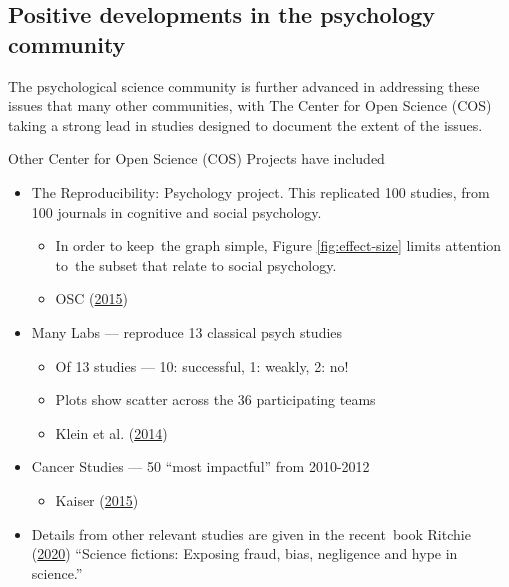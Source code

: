 \documentclass[
  10ptls,
  b5paper]{book}
\providecommand{\tightlist}{%
  \setlength{\itemsep}{0pt}\setlength{\parskip}{0pt}}
\begin{document}
\hypertarget{positive-developments-in-the-psychology-community}{%
\subsection*{Positive developments in the psychology community}\label{positive-developments-in-the-psychology-community}}

The psychological science community is further advanced in
addressing these issues that many other communities, with
The Center for Open Science (COS) taking a strong lead in
studies designed to document the extent of the issues.

Other Center for Open Science (COS) Projects have included

\begin{itemize}
\tightlist
\item
  The Reproducibility: Psychology project. This replicated
  100 studies, from 100 journals in cognitive and social
  psychology.

  \begin{itemize}
  \tightlist
  \item
    In order to keep~the graph simple, Figure
    \ref{fig:effect-size} limits attention to~the
    subset that relate to social psychology.
  \item
    OSC (\protect\hyperlink{ref-osc_EstRep2015}{2015})
  \end{itemize}
\item
  Many Labs --- reproduce 13 classical psych studies

  \begin{itemize}
  \tightlist
  \item
    Of 13 studies --- 10: successful, 1: weakly, 2: no!
  \item
    Plots show scatter across the 36 participating teams
  \item
    Klein et al. (\protect\hyperlink{ref-r7_klein_others_2014}{2014})
  \end{itemize}
\item
  Cancer Studies --- 50 ``most impactful'' from 2010-2012

  \begin{itemize}
  \tightlist
  \item
    Kaiser (\protect\hyperlink{ref-r5_kaiser_2015}{2015})
  \end{itemize}
\item
  Details from other relevant studies are given in the
  recent~book Ritchie (\protect\hyperlink{ref-ritchie2020science}{2020}) ``Science fictions: Exposing
  fraud, bias, negligence and hype in science.''
\end{itemize}
\end{document}
